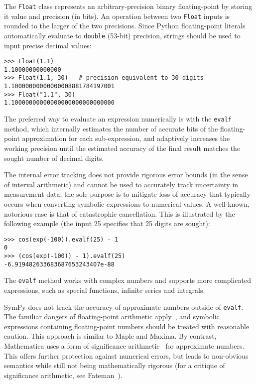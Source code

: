 The \texttt{Float} class represents an arbitrary-precision binary floating-point
by storing it value and precision (in bits). An operation between two \texttt{Float}
inputs is rounded to the larger of the two precisions.
Since Python floating-point literals automatically evaluate to \texttt{double}
(53-bit) precision, strings should be used to input precise decimal values:

\begin{verbatim}
>>> Float(1.1)
1.10000000000000
>>> Float(1.1, 30)   # precision equivalent to 30 digits
1.10000000000000008881784197001
>>> Float("1.1", 30)
1.10000000000000000000000000000
\end{verbatim}

The preferred way to evaluate an expression numerically is with the
\texttt{evalf} method, which internally estimates the number of accurate
bits of the floating-point
approximation for each sub-expression, and adaptively increases the
working precision until the estimated accuracy of the
final result matches the sought number of decimal digits.

The internal error tracking does not provide rigorous error bounds
(in the sense of interval arithmetic) and cannot be used to accurately track
uncertainty in measurement data;
the sole purpose is to mitigate loss of accuracy that typically occurs
when converting symbolic expressions to numerical values. A well-known,
notorious case
is that of catastrophic cancellation. This is illustrated by the following
example (the input 25 specifies that 25 digits are sought):

\begin{verbatim}
>>> cos(exp(-100)).evalf(25) - 1
0
>>> (cos(exp(-100)) - 1).evalf(25)
-6.919482633683687653243407e-88
\end{verbatim}

The \texttt{evalf} method works with complex numbers and supports
more complicated expressions, such as
special functions, infinite series and integrals.

SymPy does not track the accuracy of
approximate numbers outside of \texttt{evalf}.
The familiar dangers of floating-point arithmetic apply~\cite{goldberg1991every},
and symbolic expressions containing floating-point numbers should be treated
with reasonable caution.
This approach is similar to Maple and Maxima.
By contrast, Mathematica uses a form
of significance arithmetic~\cite{Sofroniou2005precise} for approximate numbers.
This offers further protection against numerical errors,
but leads to non-obvious semantics while
still not being mathematically rigorous
(for a critique of significance arithmetic, see Fateman~\cite{Fateman1992}).

